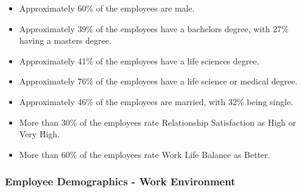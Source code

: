\documentclass[]{article}
\providecommand{\tightlist}{%
  \setlength{\itemsep}{0pt}\setlength{\parskip}{0pt}}
\begin{document}
\begin{itemize}
\tightlist
\item
  Approximately 60\% of the employees are male.
\item
  Approximately 39\% of the employees have a bachelors degree, with 27\%
  having a masters degree.
\item
  Approximately 41\% of the employees have a life sciences degree.
\item
  Approximately 76\% of the employees have a life science or medical
  degree.
\item
  Approximately 46\% of the employees are married, with 32\% being
  single.
\item
  More than 30\% of the employees rate Relationship Satisfaction as High
  or Very High.
\item
  More than 60\% of the employees rate Work Life Balance as Better.
\end{itemize}

\subsubsection{Employee Demographics - Work
Environment}\label{employee-demographics---work-environment-1}
\end{document}
